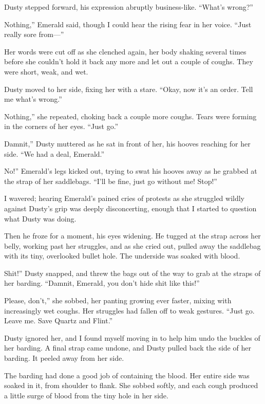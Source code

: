 Dusty stepped forward, his expression abruptly business-like. “What’s wrong?”

\leavevmode{}Nothing,” Emerald said, though I could hear the rising fear in her voice. “Just really sore from—”

Her words were cut off as she clenched again, her body shaking several times before she couldn’t hold it back any more and let out a couple of coughs. They were short, weak, and wet.

Dusty moved to her side, fixing her with a stare. “Okay, now it’s an order. Tell me what’s wrong.”

\leavevmode{}Nothing,” she repeated, choking back a couple more coughs. Tears were forming in the corners of her eyes. “Just go.”

\leavevmode{}Damnit,” Dusty muttered as he sat in front of her, his hooves reaching for her side. “We had a deal, Emerald.”

\leavevmode{}No!” Emerald’s legs kicked out, trying to swat his hooves away as he grabbed at the strap of her saddlebags. “I’ll be fine, just go without me! Stop!”

I wavered; hearing Emerald’s pained cries of protests as she struggled wildly against Dusty’s grip was deeply disconcerting, enough that I started to question what Dusty was doing.

Then he froze for a moment, his eyes widening. He tugged at the strap across her belly, working past her struggles, and as she cried out, pulled away the saddlebag with its tiny, overlooked bullet hole. The underside was soaked with blood.

\leavevmode{}Shit!” Dusty snapped, and threw the bags out of the way to grab at the straps of her barding. “Damnit, Emerald, you don’t hide shit like this!”

\leavevmode{}Please, don’t,” she sobbed, her panting growing ever faster, mixing with increasingly wet coughs. Her struggles had fallen off to weak gestures. “Just go. Leave me. Save Quartz and Flint.”

Dusty ignored her, and I found myself moving in to help him undo the buckles of her barding. A final strap came undone, and Dusty pulled back the side of her barding. It peeled away from her side.

The barding had done a good job of containing the blood. Her entire side was soaked in it, from shoulder to flank. She sobbed softly, and each cough produced a little surge of blood from the tiny hole in her side.

